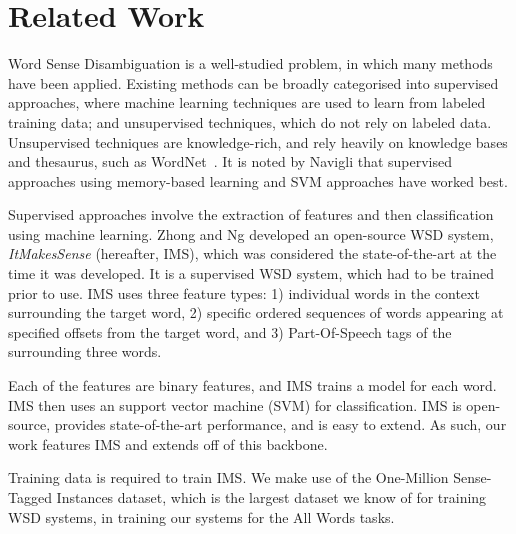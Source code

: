 \section{Related Work}

Word Sense Disambiguation is a well-studied problem, in which many
methods have been applied. Existing methods can be broadly categorised
into supervised approaches, where machine learning techniques are used
to learn from labeled training data; and unsupervised %
techniques, which do not rely on labeled data. Unsupervised techniques
are knowledge-rich, and rely heavily on knowledge bases and thesaurus,
such as WordNet~\cite{Miller1995}. It is noted by Navigli 
that supervised approaches using memory-based learning and SVM
approaches have worked best.

Supervised approaches involve the extraction of features and then
classification using machine learning. Zhong and Ng
 developed an open-source WSD system, {\it
  ItMakesSense} (hereafter, IMS), which was considered the
state-of-the-art at the time it was developed.  It is a supervised WSD
system, which had to be trained prior to use. IMS uses three feature
types: 1) individual words in the context surrounding the target word,
2) specific ordered sequences of words appearing at specified offsets
from the target word, and 3) Part-Of-Speech tags of the surrounding three
words.

Each of the features are binary features, and IMS trains a model for
each word. IMS then uses an support vector machine (SVM) for
classification. IMS is open-source, provides state-of-the-art
performance, and is easy to extend. As such, our work features IMS and
extends off of this backbone.

Training data is required to train IMS.  We make use of the
One-Million Sense-Tagged Instances \cite{taghipour2015one} dataset,
which is the largest dataset we know of for training WSD systems, in
training our systems for the All Words tasks.

